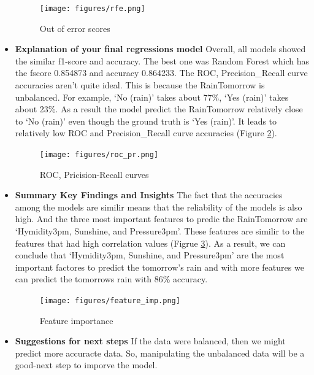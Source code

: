 \documentclass[12pt]{article}
\begin{document}
\begin{itemize}
    \begin{figure}[H]
      \centering
      \texttt{[image: figures/rfe.png]}
      \caption{Out of error scores}\label{rfe}
    \end{figure}

\item \textbf{Explanation of your final regressions model}
Overall, all models showed the similar f1-score and accuracy. The best one was Random Forest which has the fscore	0.854873 and accuracy	0.864233. The ROC, Precision\_Recall curve accuracies aren't quite ideal.
This is because the RainTomorrow is unbalanced. For example, `No (rain)' takes about 77\%, `Yes (rain)' takes about 23\%. As a result the model predict the RainTomorrow relatively close to `No (rain)' even though the ground truth is `Yes (rain)'. It leads to relatively low ROC and Precision\_Recall curve accuracies (Figure \ref{roc_pr}).

\begin{figure}[H]
  \centering
  \texttt{[image: figures/roc\_pr.png]}
  \caption{ROC, Pricision-Recall curves}\label{roc_pr}
\end{figure}

\item \textbf{Summary Key Findings and Insights}
The fact that the accuracies among the models are similir means that the reliability of the models is also high. And the three most important features to predic the RainTomorrow are `Hymidity3pm, Sunshine, and Pressure3pm'. These features are similir to the features that had high correlation values (Figrue \ref{imp}). As a result, we can conclude that `Hymidity3pm, Sunshine, and Pressure3pm' are the most important factores to predict the tomorrow's rain and with more features we can predict the tomorrows rain with 86\% accuracy.

\begin{figure}[H]
  \centering
  \texttt{[image: figures/feature\_imp.png]}
  \caption{Feature importance}\label{imp}
\end{figure}

\item \textbf{Suggestions for next steps}
If the data were balanced, then we might predict more accuracte data. So, manipulating the unbalanced data will be a good-next step to imporve the model.

\end{itemize}
\end{document}
